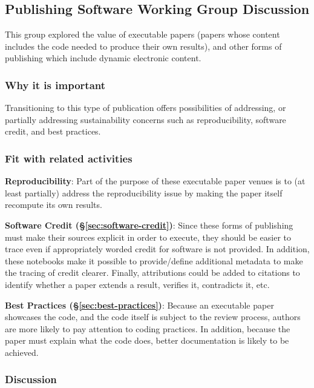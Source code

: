 \subsection{Publishing Software Working Group Discussion} \label{sec:publishing-software}

This group explored the value of executable papers (papers whose content
includes the code needed to produce their own results), and other forms of
publishing which include dynamic electronic content. 

\subsubsection{Why it is important}

Transitioning to this type
of publication offers possibilities of addressing, or partially addressing
sustainability concerns such as reproducibility, software credit, and best
practices.

\subsubsection{Fit with related activities}

\textbf{Reproducibility}: Part of the purpose of these executable paper venues
is to (at least partially) address the reproducibility issue by making the
paper itself recompute its own results.

\textbf{Software Credit (\S\ref{sec:software-credit})}: Since these forms of
publishing must make their sources explicit in order to execute, they should be
easier to trace even if appropriately worded credit for software is not
provided. In addition, these notebooks make it possible to provide/define
additional metadata to make the tracing of credit clearer. Finally,
attributions could be added to citations to identify whether a paper extends a
result, verifies it, contradicts it, etc.

\textbf{Best Practices (\S\ref{sec:best-practices})}: Because an executable paper
showcases the code, and the code itself is subject to the review process,
authors are more likely to pay attention to coding practices. In addition,
because the paper must explain what the code does, better documentation is
likely to be achieved.

\subsubsection{Discussion}

